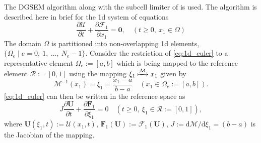 \documentclass[a4paper,11pt,oneside]{article}
\newcommand{\citear}[1]{\citeauthor{#1} \cite{#1}} %
\newcommand{\vect}[1]{\ensuremath{\boldsymbol{\mathbf{#1}}}} %
\newcommand{\pder}[2]{\frac{\partial #1}{\partial #2}} %
\newcommand{\sdd}{\ensuremath{\text{d}}} %
\newcommand{\defeq}{\ensuremath{:=}} %
\newcommand{\refelemone}{\ensuremath{\mathcal{R}}} %
\newcommand{\elemmapone}{\ensuremath{\mathcal{M}}} %
\newcommand{\eulerphy}[1]{\ensuremath{\mathcal{#1}}} %
\newcommand{\eulerref}[1]{\ensuremath{#1}} %
\begin{document}
The DGSEM algorithm along with the subcell limiter of \citear{hennemannRamirezHindenlang2021} is used. The algorithm is described here in brief for the 1d system of equations
\begin{equation}
	\pder{\vect{\eulerphy{U}}}{t} + \pder{\vect{\eulerphy{F}}_1}{x_1} = \vect{0}, \quad (t \geq 0,\ x_1 \in \Omega)
	\label{eq:1d_euler}
\end{equation}
The domain $\Omega$ is partitioned into non-overlapping 1d elements, $\{\Omega_e \mid e=0,\ 1,\ \ldots,\ N_e-1\}$. Consider the restriction of \cref{eq:1d_euler} to a representative element $\Omega_e \defeq [a,b]$ which is being mapped to the reference element $\refelemone \defeq [0,1]$ using the mapping $\xi_1 \xmapsto{\elemmapone} x_1$ given by
\begin{equation}
	\elemmapone^{-1}(x_1) = \xi_1 = \frac{x_1-a}{b-a} \quad (x_1 \in \Omega_e \defeq [a,b]).
	\label{eq:1d_element_mapping}
\end{equation}
\cref{eq:1d_euler} can then be written in the reference space as
\begin{equation}
	J \pder{\vect{\eulerref{U}}}{t} + \pder{\vect{\eulerref{F}}_1}{\xi_1} = 0 \quad (t \geq 0,\ \xi_1 \in \refelemone \defeq [0,1]),
	\label{eq:1d_euler_refelem}
\end{equation}
where $\vect{\eulerref{U}}(\xi_1,t) \defeq \vect{\eulerphy{U}}(x_1,t)$, $\vect{\eulerref{F}}_1(\vect{\eulerref{U}}) \defeq \vect{\eulerphy{F}}_1(\vect{\eulerref{U}})$, $J \defeq \sdd \elemmapone/\sdd \xi_1 = (b-a)$ is the Jacobian of the mapping.
\end{document}
